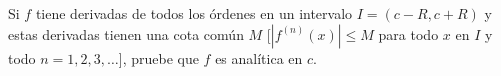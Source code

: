 \item Si $f$ tiene derivadas de todos los órdenes en un intervalo $I = (c - R, c + R)$ y estas derivadas tienen una cota común $M$ [$|f^{(n)}(x)| \le M$ para todo $x$ en $I$ y todo $n = 1, 2, 3, \dots$], pruebe que $f$ es analítica en $c$.
